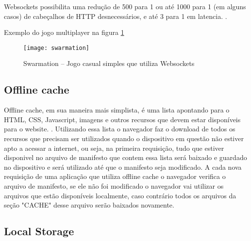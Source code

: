 Websockets possibilita uma redução de 500 para 1 ou até 1000 para 1
(em alguns casos) de cabeçalhos de HTTP desnecessários, e até 3 para 1
em latencia. \cite{lubbers2010pro}.

Exemplo do jogo multiplayer na figura \ref{img:swarmation}

\newlength{\imgwidth}
\setlength{\imgwidth}{16.09cm}
\newlength{\imgheight}
\setlength{\imgheight}{10.59cm}

\begin{figure}[H]
  \centering
	\texttt{[image: swarmation]}
  \caption{Swarmation {--} Jogo casual simples que utiliza Websockets}
  \label{img:swarmation}
\end{figure}

\clearpage



\subsection{Offline cache}
Offline cache, em sua maneira mais simplista, é uma lista apontando
para o HTML, CSS, Javascript, imagens e outros recursos que devem
estar disponíveis para o website. \cite{pilgrim2010html5}. Utilizando
essa lista o navegador faz o download de todos os recursos que
precisam ser utilizados quando o dispositivo em questão não estiver
apto a acessar a internet, ou seja, na primeira requisição, tudo que estiver
disponivel no arquivo de manifesto que contem essa lista será baixado
e guardado no dispositivo e será utilizado até que o manifesto seja
modificado.
A cada nova requisição de uma aplicação que utiliza offline cache o
navegador verifica o arquivo de manifesto, se ele não foi modificado
o navegador vai utilizar os arquivos que estão disponíveis localmente,
caso contrário todos os arquivos da seção "CACHE" desse arquivo serão baixados novamente.


\subsection{Local Storage}

